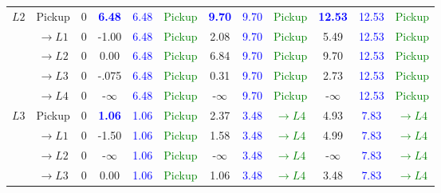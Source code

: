 \documentclass[12pt, letterpaper]{article}
\begin{document}
\begin{footnotesize}
\begin{tabular}{|l|c|c|c|c|c|c|c|c|c|c|c|}
    \hline
    \multirow{5}{*}{$L2$}   & Pickup            & 0 & \textbf{\textcolor{blue}{6.48}}      & \textcolor{blue}{6.48} & \textcolor{green}{Pickup} & \textbf{\textcolor{blue}{9.70}} & \textcolor{blue}{9.70} & \textcolor{green}{Pickup} & \textbf{\textcolor{blue}{12.53}} & \textcolor{blue}{12.53} & \textcolor{green}{Pickup} \\ \cline{2-12}
                            & $\rightarrow L1$  & 0 & -1.00     & \textcolor{blue}{6.48} & \textcolor{green}{Pickup} & 2.08 & \textcolor{blue}{9.70} & \textcolor{green}{Pickup} & 5.49 & \textcolor{blue}{12.53} & \textcolor{green}{Pickup} \\ \cline{2-12}
                            & $\rightarrow L2$  & 0 & 0.00      & \textcolor{blue}{6.48} & \textcolor{green}{Pickup} & 6.84 & \textcolor{blue}{9.70} & \textcolor{green}{Pickup} & 9.70 & \textcolor{blue}{12.53} & \textcolor{green}{Pickup} \\ \cline{2-12}
                            & $\rightarrow L3$  & 0 & -.075     & \textcolor{blue}{6.48} & \textcolor{green}{Pickup} & 0.31 & \textcolor{blue}{9.70} & \textcolor{green}{Pickup} & 2.73 & \textcolor{blue}{12.53} & \textcolor{green}{Pickup} \\ \cline{2-12}
                            & $\rightarrow L4$  & 0 & -$\infty$ & \textcolor{blue}{6.48} & \textcolor{green}{Pickup} & -$\infty$ & \textcolor{blue}{9.70} & \textcolor{green}{Pickup} & -$\infty$ & \textcolor{blue}{12.53} & \textcolor{green}{Pickup}\\ \cline{2-12}
    \hline
    \multirow{5}{*}{$L3$}   & Pickup            & 0 & \textbf{\textcolor{blue}{1.06}}     & \textcolor{blue}{1.06} & \textcolor{green}{Pickup} & 2.37 & \textcolor{blue}{3.48} & \textcolor{green}{$\rightarrow L4$} & 4.93 & \textcolor{blue}{7.83} &\textcolor{green}{$\rightarrow L4$} \\ \cline{2-12}
                            & $\rightarrow L1$  & 0 & -1.50     & \textcolor{blue}{1.06} & \textcolor{green}{Pickup} & 1.58 & \textcolor{blue}{3.48} & \textcolor{green}{$\rightarrow L4$} & 4.99 & \textcolor{blue}{7.83}& \textcolor{green}{$\rightarrow L4$} \\ \cline{2-12}
                            & $\rightarrow L2$  & 0 & -$\infty$ & \textcolor{blue}{1.06} & \textcolor{green}{Pickup} & -$\infty$ & \textcolor{blue}{3.48} & \textcolor{green}{$\rightarrow L4$} & -$\infty$ & \textcolor{blue}{7.83} & \textcolor{green}{$\rightarrow L4$} \\ \cline{2-12}
                            & $\rightarrow L3$  & 0 & 0.00      & \textcolor{blue}{1.06} & \textcolor{green}{Pickup} & 1.06 & \textcolor{blue}{3.48} & \textcolor{green}{$\rightarrow L4$} & 3.48 & \textcolor{blue}{7.83} & \textcolor{green}{$\rightarrow L4$} \\ \cline{2-12}

\end{tabular}
\end{footnotesize}
\end{document}
